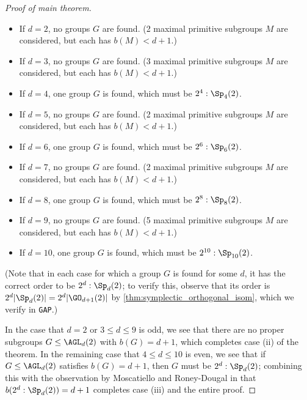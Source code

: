 \begin{proof}[Proof of main theorem]
    \begin{itemize}
        \item If $d = 2$, no groups $G$ are found. (2 maximal primitive subgroups $M$ are considered, but each has $b(M) < d + 1$.)
        \item If $d = 3$, no groups $G$ are found. (3 maximal primitive subgroups $M$ are considered, but each has $b(M) < d + 1$.)
        \item If $d = 4$, one group $G$ is found, which must be $2^4 : \Sp_4(2)$.
        \item If $d = 5$, no groups $G$ are found. (2 maximal primitive subgroups $M$ are considered, but each has $b(M) < d + 1$.)
        \item If $d = 6$, one group $G$ is found, which must be $2^6 : \Sp_6(2)$.
        \item If $d = 7$, no groups $G$ are found. (2 maximal primitive subgroups $M$ are considered, but each has $b(M) < d + 1$.)
        \item If $d = 8$, one group $G$ is found, which must be $2^8 : \Sp_8(2)$.
        \item If $d = 9$, no groups $G$ are found. (5 maximal primitive subgroups $M$ are considered, but each has $b(M) < d + 1$.)
        \item If $d = 10$, one group $G$ is found, which must be $2^{10} : \Sp_{10}(2)$.
    \end{itemize}

    (Note that in each case for which a group $G$ is found for some $d$, it has the correct order to be $2^d : \Sp_d(2)$; to verify this, observe that its order is $2^d |\Sp_d(2)| = 2^d |\GO_{d+1}(2)|$ by \autoref{thm:symplectic_orthogonal_isom}, which we verify in \texttt{GAP}.)

    In the case that $d = 2$ or $3 \leq d \leq 9$ is odd, we see that there are no proper subgroups $G \leq \AGL_d(2)$ with $b(G) = d + 1$, which completes case (ii) of the theorem. In the remaining case that $4 \leq d \leq 10$ is even, we see that if $G \leq \AGL_d(2)$ satisfies $b(G) = d + 1$, then $G$ must be $2^d : \Sp_d(2)$; combining this with the observation by Moscatiello and Roney-Dougal in \cite{moscatiello_roney-dougal2021} that $b(2^d : \Sp_d(2)) = d + 1$ completes case (iii) and the entire proof.
\end{proof}

